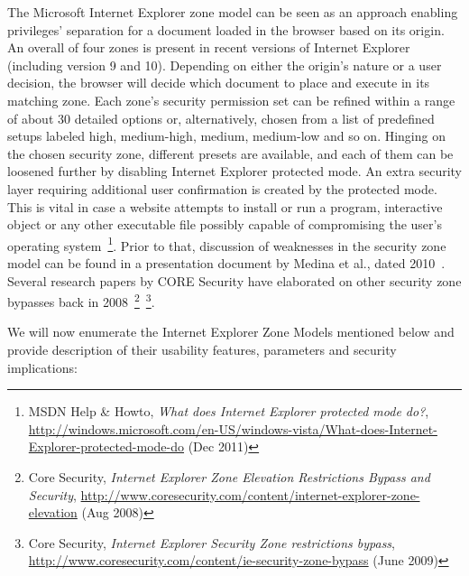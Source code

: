 	The Microsoft Internet Explorer zone model can be seen as an approach enabling privileges' separation for a document loaded in the browser based on its origin.  An overall of four zones is present in recent versions of Internet Explorer (including version 9 and 10). Depending on either the origin's nature or a user decision, the browser will decide which document to place and execute in its matching zone. Each zone's security permission set can be refined within a range of about 30 detailed options or, alternatively, chosen from a list of predefined setups labeled high, medium-high, medium, medium-low and so on. Hinging on the chosen security zone, different presets are available, and each of them can be loosened further by disabling Internet Explorer protected mode. An extra security layer requiring additional user confirmation is created by the protected mode. This is vital in case a website attempts to install or run a program, interactive object or any other executable file possibly capable of 
compromising the user's operating system~\footnote{MSDN Help \& Howto, \textit{What does Internet Explorer protected mode do?}, \url{http://windows.microsoft.com/en-US/windows-vista/What-does-Internet-Explorer-protected-mode-do} (Dec 2011)}. Prior to that, discussion of weaknesses in the security zone model can be found in a presentation document by  Medina et al., dated 2010~\cite{medina2010abusing}. Several research papers by CORE Security have elaborated on other security zone bypasses back in 2008~\footnote{Core Security, \textit{Internet Explorer Zone Elevation Restrictions Bypass and Security}, \url{http://www.coresecurity.com/content/internet-explorer-zone-elevation} (Aug 2008)}~\footnote{Core Security, \textit{Internet Explorer Security Zone restrictions bypass}, \url{http://www.coresecurity.com/content/ie-security-zone-bypass} (June 2009)}.

	We will now enumerate the Internet Explorer Zone Models mentioned below and provide description of their usability features, parameters and security implications: 

